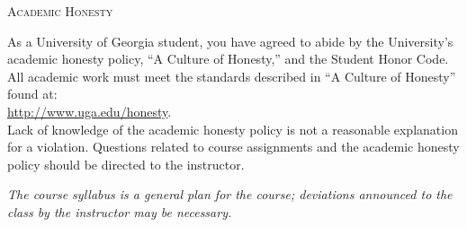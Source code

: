 \documentclass[12pt]{amsart}
\begin{document}
\medskip

\noindent
\textsc{Academic Honesty}

As a University of Georgia student, you have agreed to abide by the
University’s academic honesty policy, ``A Culture of Honesty,'' and the
Student Honor Code.  All academic work must meet the standards described in
``A Culture of Honesty'' found at: 
\\ \url{http://www.uga.edu/honesty}.  
\\
Lack
of knowledge of the academic honesty policy is not a reasonable explanation
for a violation.  Questions related to course assignments and the academic
honesty policy should be directed to the instructor.



\smallskip

\textit{The course syllabus is a general plan for the course; deviations
announced to the class by the instructor may be necessary.}
\end{document}

